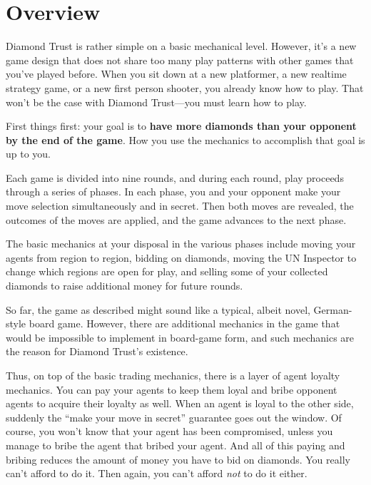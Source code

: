 \documentclass[8pt]{extbook}
\begin{document}
\makeatletter
\renewcommand\@endpart{\standardEndPart}
\makeatother





\section{Overview}
Diamond Trust is rather simple on a basic mechanical level.  However, it's a new game design that does not share too many play patterns with other games that you've played before.  When you sit down at a new platformer, a new realtime strategy game, or a new first person shooter, you already know how to play.  That won't be the case with Diamond Trust---you must learn how to play.

First things first:  your goal is to {\bf have more diamonds than your opponent by the end of the game}.  How you use the mechanics to accomplish that goal is up to you.

Each game is divided into nine rounds, and during each round, play proceeds through a series of phases.  In each phase, you and your opponent make your move selection simultaneously and in secret.  Then both moves are revealed, the outcomes of the moves are applied, and the game advances to the next phase.

The basic mechanics at your disposal in the various phases include moving your agents from region to region, bidding on diamonds, moving the UN Inspector to change which regions are open for play, and selling some of your collected diamonds to raise additional money for future rounds.

So far, the game as described might sound like a typical, albeit novel, German-style board game.  However, there are additional mechanics in the game that would be impossible to implement in board-game form, and such mechanics are the reason for Diamond Trust's existence.

Thus, on top of the basic trading mechanics, there is a layer of agent loyalty mechanics.  You can pay your agents to keep them loyal and bribe opponent agents to acquire their loyalty as well.  When an agent is loyal to the other side, suddenly the ``make your move in secret'' guarantee goes out the window.  Of course, you won't know that your agent has been compromised, unless you manage to bribe the agent that bribed your agent.  And all of this paying and bribing reduces the amount of money you have to bid on diamonds.  You really can't afford to do it.  Then again, you can't afford {\it not} to do it either.
\end{document}
